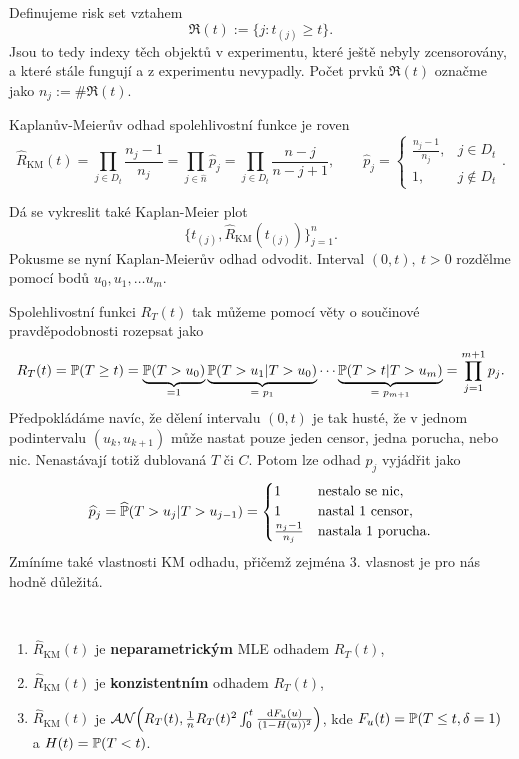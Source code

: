     \begin{define}
        Definujeme risk set vztahem 
        $$\mathfrak{R}(t) :=\lbrace j: t_{(j)} \geq t \rbrace.$$ 
        Jsou to tedy indexy těch objektů v experimentu, které ještě nebyly zcensorovány, a které stále fungují a z experimentu nevypadly. Počet prvků $\mathfrak{R}(t)$ označme jako $n_j :=\#\mathfrak{R}(t)$.
    \end{define}
    
    \begin{define}
        Kaplanův-Meierův odhad spolehlivostní funkce je roven 
        $$\widehat{R}_\mathrm{KM}(t) = \prod_{j\in D_t} \frac{n_j -1}{n_j} = \prod_{j\in \widehat{n}} \widehat{p}_j = \prod_{j\in D_t} \frac{n-j}{n-j+1},\quad \quad  \widehat{p}_j = \begin{cases}
            \frac{n_j - 1}{n_j},& j\in D_t \\1, & j\notin D_t \end{cases}. $$
    \end{define}
    Dá se vykreslit také Kaplan-Meier plot $$ \lbrace t_{(j)}, \widehat{R}_\mathrm{KM}(t_{(j)}) \rbrace_{j=1}^n .$$ Pokusme se nyní Kaplan-Meierův odhad odvodit.
    Interval $(0,t),~t>0$ rozdělme pomocí bodů $u_0, u_1, \dots u_m$.

    Spolehlivostní funkci $R_T(t)$ tak můžeme pomocí věty o součinové pravděpodobnosti rozepsat jako
    $$ R_T(t) = \mathbb{P}(T \geq t) = \underbrace{\mathbb{P}(T > u_0)}_{\text{=1}} \underbrace{\mathbb{P}(T > u_1|T>u_0)}_{\text{= $p_{1}$}}\cdots\underbrace{\mathbb{P}(T > t|T>u_m)}_{\text{= $p_{m+1}$}} = \prod_{j=1}^{m+1} p_j.$$
    Předpokládáme navíc, že dělení intervalu $(0,t)$ je tak husté, že v jednom podintervalu $(u_k , u_{k+1})$ může nastat pouze jeden censor, jedna porucha, nebo nic. Nenastávají totiž dublovaná $T$ či $C$. Potom lze odhad $p_j$ vyjádřit jako
    $$\widehat{p}_j = \widehat{\mathbb{P}}(T>u_j|T > u_{j-1}) = \begin{cases}
        1 & \text{nestalo~se~nic}, \\1 & \mathrm{nastal~1~censor}, \\ \frac{n_j -1}{n_j}&  \text{nastala~1~porucha}. \end{cases} $$
    Zmíníme také vlastnosti KM odhadu, přičemž zejména 3. vlasnost je pro nás hodně důležitá.
    
    \begin{theorem}~
        \begin{enumerate}
            \item $\widehat{R}_\mathrm{KM}(t)$ je \textbf{neparametrickým} MLE odhadem $R_T(t)$,
            \item $\widehat{R}_\mathrm{KM}(t)$ je \textbf{konzistentním} odhadem $R_T(t)$,
            \item $\widehat{R}_\mathrm{KM}(t)$ je $\mathcal{AN}\Big(R_T(t), \frac{1}{n}R_T(t)^2 \int_0^t \frac{\mathrm{d} F_u(u)}{(1-H(u))^2} \Big)$, kde $F_u(t) = \mathbb{P}(T\leq t,\delta=1)$ a $H(t) = \mathbb{P}(T < t)$.
        \end{enumerate}
    \end{theorem}
    
